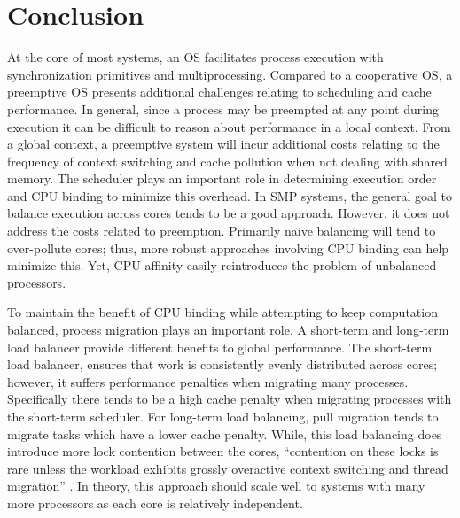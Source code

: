 \documentclass[11pt]{article}
\begin{document}
\section{Conclusion}
\label{sec:conclusion}
At the core of most systems, an OS facilitates process execution with synchronization primitives and multiprocessing.  Compared to a cooperative OS, a preemptive OS presents additional challenges relating to scheduling and cache performance.  In general, since a process may be preempted at any point during execution it can be difficult to reason about performance in a local context.  From a global context, a preemptive system will incur additional costs relating to the frequency of context switching and cache pollution when not dealing with shared memory.  The scheduler plays an important role in determining execution order and CPU binding to minimize this overhead.  In SMP systems, the general goal to balance execution across cores tends to be a good approach.  However, it does not address the costs related to preemption.  Primarily naive balancing will tend to over-pollute cores; thus, more robust approaches involving CPU binding can help minimize this.  Yet, CPU affinity easily reintroduces the problem of unbalanced processors.

To maintain the benefit of CPU binding while attempting to keep computation balanced, process migration plays an important role.  A short-term and long-term load balancer provide different benefits to global performance.  The short-term load balancer, ensures that work is consistently evenly distributed across cores; however, it suffers performance penalties when migrating many processes.  Specifically there tends to be a high cache penalty when migrating processes with the short-term scheduler.  For long-term load balancing, pull migration tends to migrate tasks which have a lower cache penalty.  While, this load balancing does introduce more lock contention between the cores, ``contention on these locks is rare unless the workload exhibits grossly overactive context switching and thread migration'' \cite{freebsd}. In theory, this approach should scale well to systems with many more processors as each core is relatively independent.
\end{document}
